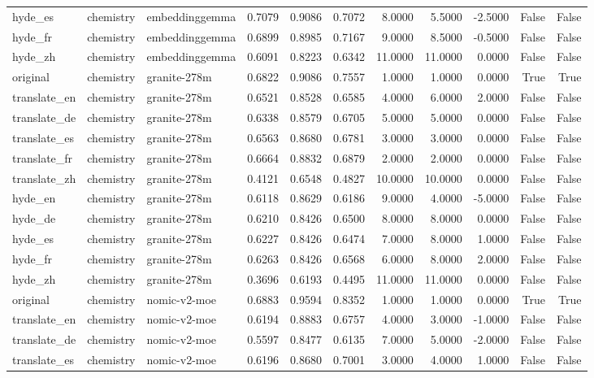 \begin{tabular}{lllrrrrrrrr}
hyde\_es & chemistry & embeddinggemma & 0.7079 & 0.9086 & 0.7072 & 8.0000 & 5.5000 & -2.5000 & False & False \\
hyde\_fr & chemistry & embeddinggemma & 0.6899 & 0.8985 & 0.7167 & 9.0000 & 8.5000 & -0.5000 & False & False \\
hyde\_zh & chemistry & embeddinggemma & 0.6091 & 0.8223 & 0.6342 & 11.0000 & 11.0000 & 0.0000 & False & False \\
original & chemistry & granite-278m & 0.6822 & 0.9086 & 0.7557 & 1.0000 & 1.0000 & 0.0000 & True & True \\
translate\_en & chemistry & granite-278m & 0.6521 & 0.8528 & 0.6585 & 4.0000 & 6.0000 & 2.0000 & False & False \\
translate\_de & chemistry & granite-278m & 0.6338 & 0.8579 & 0.6705 & 5.0000 & 5.0000 & 0.0000 & False & False \\
translate\_es & chemistry & granite-278m & 0.6563 & 0.8680 & 0.6781 & 3.0000 & 3.0000 & 0.0000 & False & False \\
translate\_fr & chemistry & granite-278m & 0.6664 & 0.8832 & 0.6879 & 2.0000 & 2.0000 & 0.0000 & False & False \\
translate\_zh & chemistry & granite-278m & 0.4121 & 0.6548 & 0.4827 & 10.0000 & 10.0000 & 0.0000 & False & False \\
hyde\_en & chemistry & granite-278m & 0.6118 & 0.8629 & 0.6186 & 9.0000 & 4.0000 & -5.0000 & False & False \\
hyde\_de & chemistry & granite-278m & 0.6210 & 0.8426 & 0.6500 & 8.0000 & 8.0000 & 0.0000 & False & False \\
hyde\_es & chemistry & granite-278m & 0.6227 & 0.8426 & 0.6474 & 7.0000 & 8.0000 & 1.0000 & False & False \\
hyde\_fr & chemistry & granite-278m & 0.6263 & 0.8426 & 0.6568 & 6.0000 & 8.0000 & 2.0000 & False & False \\
hyde\_zh & chemistry & granite-278m & 0.3696 & 0.6193 & 0.4495 & 11.0000 & 11.0000 & 0.0000 & False & False \\
original & chemistry & nomic-v2-moe & 0.6883 & 0.9594 & 0.8352 & 1.0000 & 1.0000 & 0.0000 & True & True \\
translate\_en & chemistry & nomic-v2-moe & 0.6194 & 0.8883 & 0.6757 & 4.0000 & 3.0000 & -1.0000 & False & False \\
translate\_de & chemistry & nomic-v2-moe & 0.5597 & 0.8477 & 0.6135 & 7.0000 & 5.0000 & -2.0000 & False & False \\
translate\_es & chemistry & nomic-v2-moe & 0.6196 & 0.8680 & 0.7001 & 3.0000 & 4.0000 & 1.0000 & False & False \\

\end{tabular}
